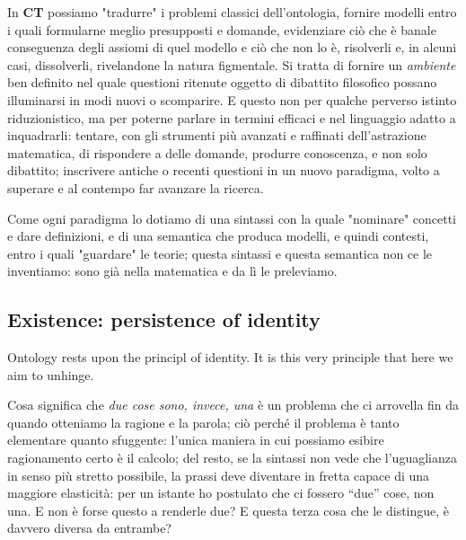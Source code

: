 \documentclass{amsart}
\begin{document}
In \textbf{CT} possiamo "tradurre" i problemi classici dell'ontologia, fornire modelli entro i quali formularne meglio presupposti e domande, evidenziare ciò che è banale conseguenza degli assiomi di quel modello e ciò che non lo è, risolverli e, in alcuni casi, dissolverli, rivelandone la natura figmentale. Si tratta di fornire un \emph{ambiente} ben definito nel quale questioni ritenute oggetto di dibattito filosofico possano illuminarsi in modi nuovi o scomparire. E questo non per qualche perverso istinto riduzionistico, ma per poterne parlare in termini efficaci e nel linguaggio adatto a inquadrarli: tentare, con gli strumenti più avanzati e raffinati dell'astrazione matematica, di rispondere a delle domande, produrre conoscenza, e non solo dibattito; inscrivere antiche o recenti questioni in un nuovo paradigma, volto a superare e al contempo far avanzare la ricerca.
	
Come ogni paradigma lo dotiamo di una sintassi con la quale "nominare" concetti e dare definizioni, e di una semantica che produca modelli, e quindi contesti, entro i quali "guardare" le teorie; questa sintassi e questa semantica non ce le inventiamo: sono già nella matematica e da lì le preleviamo.
\subsection{Existence: persistence of identity}
Ontology rests upon the principl of identity. It is this very principle that here we aim to unhinge.

Cosa significa che \emph{due cose sono, invece, una} è un problema che ci arrovella fin da quando otteniamo la ragione e la parola; ciò perché il problema è tanto elementare quanto sfuggente: l'unica maniera in cui possiamo esibire ragionamento certo è il calcolo; del resto, se la sintassi non vede che l'uguaglianza in senso più stretto possibile, la prassi deve diventare in fretta capace di una maggiore elasticità: per un istante ho postulato che ci fossero ``due'' cose, non una. E non è forse questo a renderle due? E questa terza cosa che le distingue, è davvero diversa da entrambe?
\end{document}
